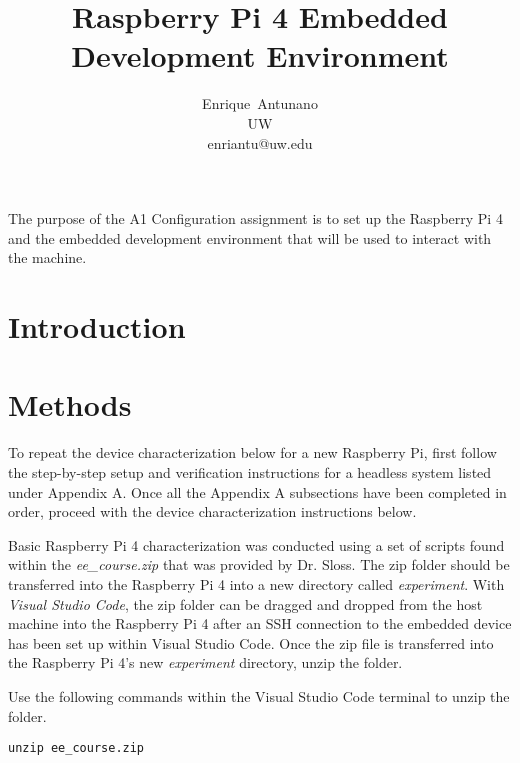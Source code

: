\documentclass[journal]{IEEEtran}
\begin{document}
    \title{Raspberry Pi 4 Embedded Development Environment}

    \author{Enrique~Antunano\\UW\\enriantu@uw.edu}


    \maketitle

    \begin{abstract}

    \end{abstract}
    The purpose of the A1 Configuration assignment is to set up the Raspberry Pi 4 and the embedded development environment that will be used to interact with the machine. 
    \section{Introduction}

    \section{Methods}
    To repeat the device characterization below for a new Raspberry Pi, first follow the step-by-step setup and verification instructions for a headless system listed under Appendix A. 
    Once all the Appendix A subsections have been completed in order, proceed with the device characterization instructions below.

    Basic Raspberry Pi 4 characterization was conducted using a set of scripts found within the \emph{ee\_course.zip} that was provided by Dr. Sloss. 
    The zip folder should be transferred into the Raspberry Pi 4 into a new directory called \emph{experiment}.
    With \emph{Visual Studio Code}, the zip folder can be dragged and dropped from the host machine into the Raspberry Pi 4 after an SSH connection to the embedded device has been set up within Visual Studio Code.
    Once the zip file is transferred into the Raspberry Pi 4's new \emph{experiment} directory, unzip the folder. \newline

    Use the following commands within the Visual Studio Code terminal to unzip the folder.

    \begin{lstlisting}[frame=single]
        unzip ee_course.zip
    \end{lstlisting}
\end{document}
